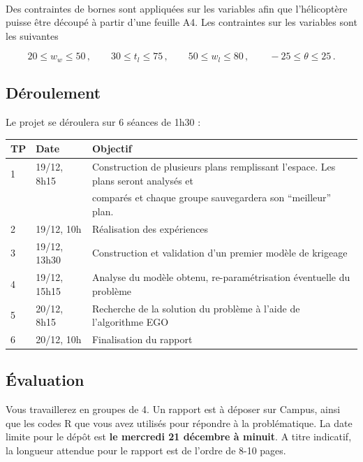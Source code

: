 \documentclass[a4paper,10pt]{article}
\begin{document}
\paragraph{}
Des contraintes de bornes sont appliquées sur les variables afin que l'hélicoptère puisse être découpé à partir d'une feuille A4. Les contraintes sur les variables sont les suivantes

\begin{equation*}
20  \leq w_w \leq 50 \, , \qquad 30 \leq t_l \leq 75 \, , \qquad 50   \leq w_l \leq 80 \, , \qquad -25  \leq \theta \leq 25 \, .
\end{equation*}

\subsection*{Déroulement}

Le projet se déroulera sur 6 séances de 1h30 :
\begin{center}
\begin{tabular}{l|l|l}
 TP & Date & Objectif \\
 \hline
 1 & 19/12, 8h15 & Construction de plusieurs plans remplissant l'espace. Les plans seront analysés et \\
 & & comparés et chaque groupe sauvegardera son ``meilleur'' plan.\\
 \hline
 2 & 19/12, 10h & Réalisation des expériences \\
 \hline
 3 & 19/12, 13h30 & Construction et validation d'un premier modèle de krigeage\\
 \hline
 4 & 19/12, 15h15 & Analyse du modèle obtenu, re-paramétrisation éventuelle du problème\\
  \hline
 5 & 20/12, 8h15 & Recherche de la solution du problème à l'aide de l'algorithme EGO\\
  \hline
 6 & 20/12, 10h & Finalisation du rapport
\end{tabular}
\end{center}

\subsection*{Évaluation}
Vous travaillerez en groupes de 4. Un rapport est à déposer sur Campus, ainsi que les codes R que vous avez utilisés pour répondre à la problématique. La date limite pour le dépôt est \textbf{le mercredi 21 décembre à minuit}. A titre indicatif, la longueur attendue pour le rapport est de l'ordre de 8-10 pages.
\end{document}
